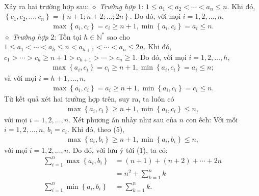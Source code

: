 \begin{multicols}{2}
\begin{align*}
	\end{align*}
	Xảy ra hai trường hợp sau:
	\vskip 0.05cm
	$\diamond$ \textit{Trường hợp} $1$: $1 \le {a_1} < {a_2} < \cdots  < {a_n} \le n.$
	\vskip 0.05cm  
	Khi đó, $\left\{ {{c_1},{c_2}, \ldots ,{c_n}} \right\} \!=\! \left\{ {n \!+\! 1;n \!+\! 2; \ldots ;2n} \right\}\!.$  Do đó, với mọi $i = 1, 2, \ldots, n$,
	\begin{align*}
		\max \!\left\{\! {{a_i},{c_i}} \!\right\} \!=\! {c_i} \!\ge\! n \!+\! 1, \min\! \left\{\! {{a_i},{c_i}} \!\right\} \!=\! {a_i} \!\le\! n.
	\end{align*}
	$\diamond$ \textit{Trường hợp} $2$: Tồn tại $h \in \mathbb{N^*}$  sao cho  $1 \le {a_1} <  \cdots  < {a_h} \le n < {a_{h + 1}} <  \cdots  < {a_n} \le 2n.$ 
	\vskip 0.05cm
	Khi đó, ${c_1} >  \cdots  > {c_h} \ge n + 1 > {c_{h + 1}} >  \cdots  > {c_n} \ge 1.$ 
	\vskip 0.05cm
	Do đó, với mọi $i = 1, 2, \ldots , h$,
	\begin{align*}
		\max \!\left\{\! {{a_i},{c_i}} \!\right\} \!=\! {c_i} \!\ge\! n \!+\! 1, \min\! \left\{ \!{{a_i},{c_i}} \!\right\} \!=\! {a_i} \!\le\! n;
	\end{align*}
	và với mọi $i = h + 1, \ldots , n$,
	\begin{align*}
		\max\! \left\{\! {{a_i},{c_i}} \!\right\} \!=\! {a_i} \!\ge\! n \!+\! 1, \min\! \left\{\! {{a_i},{c_i}} \!\right\} \!=\! {c_i} \!\le\! n.
	\end{align*}
	Từ kết quả xét hai trường hợp trên, suy ra, ta luôn có
	\begin{align*}
		\max \!\left\{\! {{a_i},{c_i}} \!\right\} \!\ge\! n \!+\! 1,\min\! \left\{\! {{a_i},{c_i}} \!\right\} \!\le\! n, \tag{$5$}
	\end{align*}
	với mọi $i = 1, 2, \ldots, n$.
	\vskip 0.05cm
	Xét phương án nhảy như sau của $n$ con ếch: Với mỗi $i = 1, 2, \ldots, n$, $b_i = c_i$.
	\vskip 0.05cm  
	Khi đó, theo ($5$),
	\begin{align*}
		\max \!\left\{\! {{a_i},{b_i}} \!\right\} \!\ge\! n \!+\! 1,\min\! \left\{\! {{a_i},{b_i}} \!\right\} \!\le\! n,
	\end{align*}
	với mọi $i = 1, 2, \ldots , n$.
	\vskip 0.05cm
	Do đó, với lưu ý tới ($1$), ta có:
	\begin{align*}
		\sum\limits_{i = 1}^n {\max \left\{ {{a_i},{b_i}} \right\}}  &= \left( {n \!+\! 1} \right) \!+\! \left( {n \!+\! 2} \right) \!+\!  \cdots \! +\! 2n \\[-1.2ex]
		&= {n^2} + \sum\limits_{k = 1}^n k\\[-1.2ex]
		\sum\limits_{i = 1}^n {\min \left\{ {{a_i},{b_i}} \right\}}  &= \sum\limits_{k = 1}^n k.

\end{align*}
\end{multicols}
